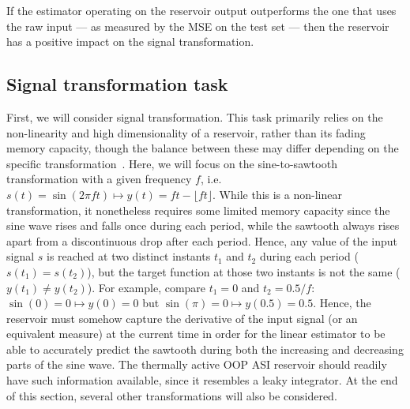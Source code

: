 If the estimator operating on the reservoir output outperforms the one that uses the raw input --- as measured by the MSE on the test set --- then the reservoir has a positive impact on the signal transformation.

\subsection{Signal transformation task}
First, we will consider signal transformation.
This task primarily relies on the non-linearity and high dimensionality of a reservoir, rather than its fading memory capacity, though the balance between these may differ depending on the specific transformation~\cite{FewMoleculeReservoir,gartside2022reconfigurable,TaskAdaptivePRC}.
Here, we will focus on the sine-to-sawtooth transformation with a given frequency $f$, i.e. $s(t) = \sin(2 \pi f t) \mapsto y(t) = ft - \lfloor ft \rfloor$.
While this is a non-linear transformation, it nonetheless requires some limited memory capacity since the sine wave rises and falls once during each period, while the sawtooth always rises apart from a discontinuous drop after each period.
Hence, any value of the input signal $s$ is reached at two distinct instants $t_1$ and $t_2$ during each period ($s(t_1) = s(t_2)$), but the target function at those two instants is not the same ($y(t_1) \neq y(t_2)$). %
For example, compare $t_1 = 0$ and $t_2 = 0.5/f$: $\sin(0) = 0 \mapsto y(0) = 0$ but $\sin(\pi) = 0 \mapsto y(0.5) = 0.5$.
Hence, the reservoir must somehow capture the derivative of the input signal (or an equivalent measure) at the current time in order for the linear estimator to be able to accurately predict the sawtooth during both the increasing and decreasing parts of the sine wave.
The thermally active OOP ASI reservoir should readily have such information available, since it resembles a leaky integrator. 
At the end of this section, several other transformations will also be considered.

